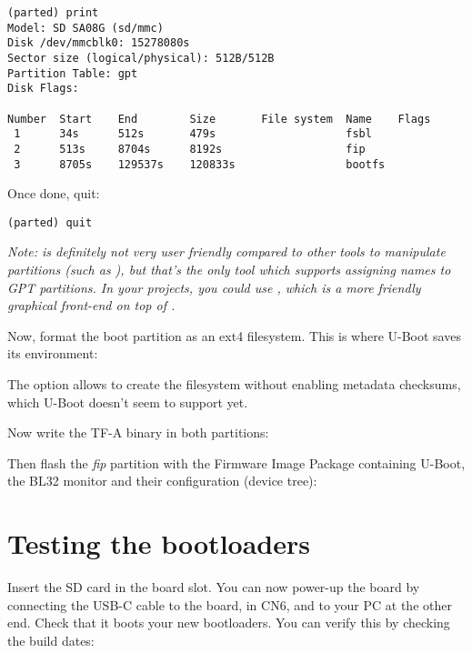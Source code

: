\begin{verbatim}
(parted) print
Model: SD SA08G (sd/mmc)
Disk /dev/mmcblk0: 15278080s
Sector size (logical/physical): 512B/512B
Partition Table: gpt
Disk Flags: 

Number  Start    End        Size       File system  Name    Flags
 1      34s      512s       479s                    fsbl
 2      513s     8704s      8192s                   fip
 3      8705s    129537s    120833s                 bootfs
\end{verbatim}

Once done, quit:
\begin{verbatim}
(parted) quit
\end{verbatim}

{\em Note:  is definitely not very user friendly compared
to other tools to manipulate partitions (such as ), but
that's the only tool which supports assigning names to GPT partitions.
In your projects, you could use , which is a more
friendly graphical front-end on top of .}

Now, format the boot partition as an ext4 filesystem. This is where
U-Boot saves its environment:

The  option allows to create the filesystem
without enabling metadata checksums, which U-Boot doesn't seem to
support yet.

Now write the TF-A binary in both  partitions:


Then flash the {\em fip} partition with the Firmware Image Package
containing U-Boot, the BL32 monitor and their configuration (device tree):


\section{Testing the bootloaders}

Insert the SD card in the board slot. You can now power-up the board
by connecting the USB-C cable to the board, in CN6,  and
to your PC at the other end. Check that it boots your new bootloaders.
You can verify this by checking the build dates:

